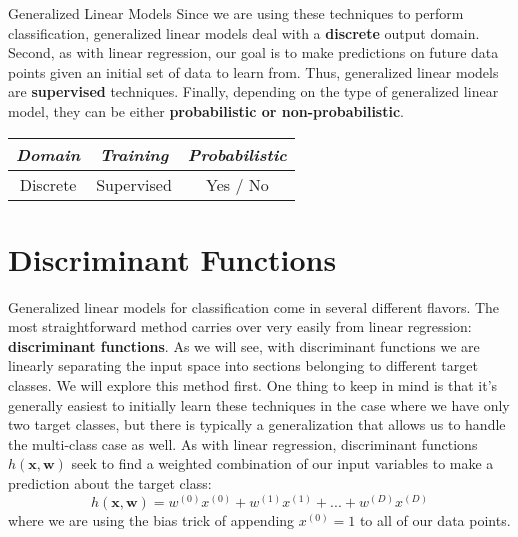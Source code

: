 \begin{mlcube}{Generalized Linear Models}
Since we are using these techniques to perform classification, generalized linear models deal with a \textbf{discrete} output domain. Second, as with linear regression, our goal is to make predictions on future data points given an initial set of data to learn from. Thus, generalized linear models are \textbf{supervised} techniques. Finally, depending on the type of generalized linear model, they can be either \textbf{probabilistic or non-probabilistic}.
\begin{center}
    \begin{tabular}{c|c|c}
    \textit{\textbf{Domain}} & \textit{\textbf{Training}} & \textit{\textbf{Probabilistic}} \\
    \hline
    Discrete & Supervised & Yes / No \\
    \end{tabular}
\end{center}
\end{mlcube}

\section{Discriminant Functions}
Generalized linear models for classification come in several different flavors. The most straightforward method carries over very easily from linear regression: \textbf{discriminant functions}. As we will see, with discriminant functions we are linearly separating the input space into sections belonging to different target classes. We will explore this method first. One thing to keep in mind is that it's generally easiest to initially learn these techniques in the case where we have only two target classes, but there is typically a generalization that allows us to handle the multi-class case as well. \newline \newline
As with linear regression, discriminant functions $h(\textbf{x}, \textbf{w})$ seek to find a weighted combination of our input variables to make a prediction about the target class:
\begin{equation} \label{basic-discriminant-fn}
	h(\textbf{x}, \textbf{w}) = w^{(0)}x^{(0)} + w^{(1)}x^{(1)} + ... + w^{(D)}x^{(D)}
\end{equation}
where we are using the bias trick of appending $x^{(0)} = 1$ to all of our data points.

